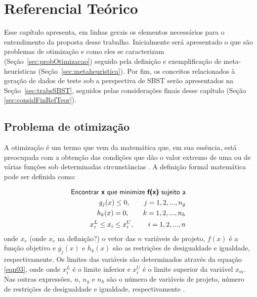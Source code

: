 \chapter[Referencial Teórico]{Referencial Teórico} \label{referencialteorico} 
Esse capítulo apresenta, em linhas gerais os elementos necessários para o entendimento da proposta desse trabalho. Inicialmente será apresentado o que são problemas de otimização e como eles se caracterizam (Seção~\ref{sec:probOtimizacao}) seguido pela definição e exemplificação de meta-heurísticas (Seção~\ref{sec:metaheuristica}). Por fim, os conceitos relacionados à geração de dados de teste sob a perspectiva de SBST serão apresentados na Seção~\ref{sec:trabsSBST}, seguidos pelas considerações finais desse capítulo (Seção \ref{sec:considFinRefTeor}).  




\section{Problema de otimização \label{sec:probOtimizacao}}

A otimização é um termo que vem da matemática que, em sua essência, está
preocupada com a obtenção das condições que dão o valor extremo de uma ou de
várias funções sob determinadas circunstâncias \cite{snyman2005practical}. A definição formal
matemática pode ser definida como: 

\begin{eqnarray}
\label{eqn01}
	 \textsf{Encontrar \textbf{x} que minimize \textbf{f(x)} sujeito a} \nonumber \\
     g_j(x) \leq 0, \qquad j = 1, 2, ..., n_g \\
\label{eqn02}
      h_k(x) = 0, \qquad k = 1, 2, ..., n_h \\
\label{eqn03}
      x_{i}^{L} \leq x_i \leq x_{i}^{U}, \qquad i = 1, 2, ..., n 
\end{eqnarray}
onde $x_{e}$ (onde $x_e$ na definição?) o vetor das $n$ variáveis de projeto, $f(x)$ é a função objetivo e $g_{j}(x)$ e $h_{k}(x)$ são as restrições de desigualdade e igualdade, respectivamente. Os limites das variáveis são determinados através da equação \ref{eqn03}, onde onde $x_{i}^{L}$ é o limite inferior e $x_{i}^{U}$ é o limite superior da variável $x_{m}$. Nas outras expressões, $n$, $n_{g}$ e $n_{h}$ são o número de variáveis de projeto, número de restrições de desigualdade e igualdade, respectivamente \cite{gandomi2013metaheuristic}.  

